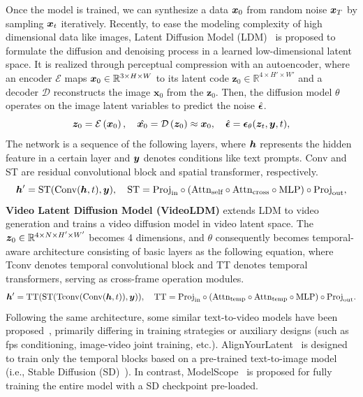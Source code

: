 Once the model is trained, we can synthesize a data $\boldsymbol{x}_0$ from random noise $\boldsymbol{x}_T$ by sampling $\boldsymbol{x}_t$ iteratively. Recently, to ease the modeling complexity of high dimensional data like images, Latent Diffusion Model (LDM)~\citep{ldm} is proposed to formulate the diffusion and denoising process in a learned low-dimensional latent space. It is realized through perceptual compression with an autoencoder, where an encoder $\mathcal{E}$ maps $\boldsymbol{x}_0 \in \mathbb{R}^{3 \times H \times W}$ to its latent code $\boldsymbol{z}_0 \in \mathbb{R}^{4 \times H' \times W'}$ and a decoder $\mathcal{D}$ reconstructs the image $\boldsymbol{x}_{0}$ from the $\boldsymbol{z}_0$. Then, the diffusion model $\theta$ operates on the image latent variables to predict the noise $\hat{{\boldsymbol{\epsilon}}}$.
%
\begin{equation}
\boldsymbol{z}_0=\mathcal{E}\left(\boldsymbol{x}_0\right), \quad \hat{\boldsymbol{x}_0} = \mathcal{D}\left(\boldsymbol{z}_0\right) \approx \boldsymbol{x}_0, 
\quad \hat{{\boldsymbol{\epsilon}}} = {\boldsymbol{\epsilon}}_\theta(\boldsymbol{z}_t, \boldsymbol{y}, t),
\end{equation}
The network is a sequence of the following layers, where $\boldsymbol{h}$ represents the hidden feature in a certain layer and $\boldsymbol{y}$ denotes conditions like text prompts. Conv and ST are residual convolutional block and spatial transformer, respectively.
\begin{equation}
\boldsymbol{h}' = \mathrm{ST}(\mathrm{Conv}(\boldsymbol{h}, t), \boldsymbol{y}), \quad \mathrm{ST} = \mathrm{Proj}_{\text{in}} \circ (\mathrm{Attn}_{\text{self}} \circ \mathrm{Attn}_{\text{cross}} \circ \mathrm{MLP}) \circ \mathrm{Proj}_{\text{out}}, 
\end{equation}
\noindent\textbf{Video Latent Diffusion Model (VideoLDM)} \citep{blattmann2023align} extends LDM to video generation and trains a video diffusion model in video latent space. 
The $\boldsymbol{z}_0 \in \mathbb{R}^{4 \times N \times H' \times W'}$ becomes 4 dimensions, and $\theta$ consequently becomes temporal-aware architecture consisting of basic layers as the following equation, where Tconv denotes temporal convolutional block and TT denotes temporal transformers, serving as cross-frame operation modules.
\begin{gather}
\boldsymbol{h}' = \mathrm{TT}(\mathrm{ST}(\mathrm{Tconv}(\mathrm{Conv}(\boldsymbol{h}, t)), \boldsymbol{y})),
\quad \mathrm{TT} = \mathrm{Proj}_{\mathrm{in}} \circ (\mathrm{Attn}_{\text{temp}} \circ \mathrm{Attn}_{\text{temp}} \circ \mathrm{MLP}) \circ \mathrm{Proj}_{\text{out}}.
\end{gather}
Following the same architecture, some similar text-to-video models have been proposed~\citep{blattmann2023align,wang2023modelscope}, primarily differing in training strategies or auxiliary designs (such as fps conditioning, image-video joint training, etc.). AlignYourLatent~\citep{blattmann2023align} is designed to train only the temporal blocks based on a pre-trained text-to-image model (i.e., Stable Diffusion (SD)~\citep{ldm}). In contrast, ModelScope~\citep{wang2023modelscope} is proposed for fully training the entire model with a SD checkpoint pre-loaded.

